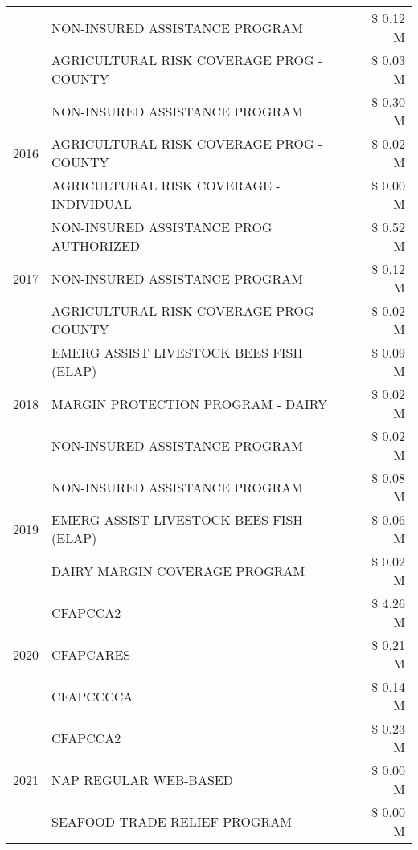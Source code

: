 \begin{tabular}{llr}
 & NON-INSURED ASSISTANCE PROGRAM & \$ 0.12 M \\
 & AGRICULTURAL RISK COVERAGE PROG - COUNTY & \$ 0.03 M \\
\cline{1-3}
\multirow[t]{3}{*}{2016} & NON-INSURED ASSISTANCE PROGRAM                & \$ 0.30 M \\
 & AGRICULTURAL RISK COVERAGE PROG - COUNTY      & \$ 0.02 M \\
 & AGRICULTURAL RISK COVERAGE - INDIVIDUAL       & \$ 0.00 M \\
\cline{1-3}
\multirow[t]{3}{*}{2017} & NON-INSURED ASSISTANCE PROG AUTHORIZED & \$ 0.52 M \\
 & NON-INSURED ASSISTANCE PROGRAM & \$ 0.12 M \\
 & AGRICULTURAL RISK COVERAGE PROG - COUNTY & \$ 0.02 M \\
\cline{1-3}
\multirow[t]{3}{*}{2018} & EMERG ASSIST LIVESTOCK BEES FISH (ELAP) & \$ 0.09 M \\
 & MARGIN PROTECTION PROGRAM - DAIRY & \$ 0.02 M \\
 & NON-INSURED ASSISTANCE PROGRAM & \$ 0.02 M \\
\cline{1-3}
\multirow[t]{3}{*}{2019} & NON-INSURED ASSISTANCE PROGRAM & \$ 0.08 M \\
 & EMERG ASSIST LIVESTOCK BEES FISH (ELAP) & \$ 0.06 M \\
 & DAIRY MARGIN COVERAGE PROGRAM & \$ 0.02 M \\
\cline{1-3}
\multirow[t]{3}{*}{2020} & CFAPCCA2 & \$ 4.26 M \\
 & CFAPCARES & \$ 0.21 M \\
 & CFAPCCCCA & \$ 0.14 M \\
\cline{1-3}
\multirow[t]{3}{*}{2021} & CFAPCCA2 & \$ 0.23 M \\
 & NAP REGULAR WEB-BASED & \$ 0.00 M \\
 & SEAFOOD TRADE RELIEF PROGRAM & \$ 0.00 M \\
\cline{1-3}
\bottomrule
\end{tabular}
